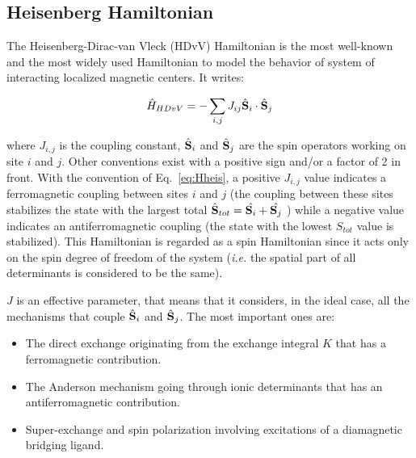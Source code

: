 \documentclass[12pt,a4paper]{report}
\numberwithin{equation}{section}
\begin{document}
\subsection*{Heisenberg Hamiltonian}
The Heisenberg-Dirac-van Vleck (HDvV) Hamiltonian is the most well-known and the most widely used Hamiltonian to model the behavior of system of interacting localized magnetic centers\cite{s_theory_1932}.
It writes:

\begin{equation}\label{eq:Hheis}
    \hat{H}_{HDvV}=-\sum_{i,j} J_{ij} \hat{\vb S}_i \cdot \hat{\vb S}_j
\end{equation}

\noindent where $J_{i,j}$ is the coupling constant, $\hat{\vb S}_i$ and $\hat{\vb S}_j$ are the spin operators working on site $i$ and $j$. Other conventions exist with a positive sign and/or a factor of 2 in front.  
With the convention of Eq.~\ref{eq:Hheis}, a positive $J_{i,j}$ value indicates a ferromagnetic coupling between sites $i$ and $j$ (the coupling between these sites stabilizes the state with the largest total $\hat{\vb S}_{tot}=\hat{\vb S_i}+\hat{\vb S_j}$ ) while a negative value indicates an antiferromagnetic coupling (the state with the lowest $S_{tot}$ value is stabilized).
This Hamiltonian is regarded as a spin Hamiltonian since it acts only on the spin degree of freedom of the system (\textit{i.e.} the spatial part of all determinants is considered to be the same).

$J$  is an effective parameter, that means that it considers, in the ideal case, all the mechanisms that couple $\hat{\vb S}_i$ and $\hat{\vb S}_j$. The most important ones are:
\begin{itemize}
    \item[1-] The direct exchange originating from the exchange integral $K$ that has a ferromagnetic contribution.
    \item[2-] The Anderson mechanism going through ionic determinants that has an antiferromagnetic contribution.
    \item[3-] Super-exchange and spin polarization involving excitations of a diamagnetic bridging ligand.
\end{itemize}
\end{document}
